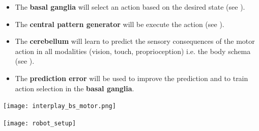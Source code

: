 \documentclass[portrait,final,a0paper,fontscale=0.33]{baposter}
\begin{document}
\begin{poster}
{\begin{adjustbox}{minipage=0.95\textwidth, margin=5pt, center}
	\begin{minipage}[l]{0.4\textwidth}
		\begin{itemize}
		\item The \textbf{basal ganglia} will select an action based on the desired state (see \cite{baladronHabitLearningHierarchical2020}).
		\item The \textbf{central pattern generator} will be execute the action (see \cite{nassourConcreteActionRepresentation2020}).
		\item The \textbf{cerebellum} will learn to predict the sensory consequences of the motor action in all modalities (vision, touch, proprioception) i.e. the body schema (see \cite{schmidForwardModelsCerebellum2019}). 
		\item The \textbf{prediction error} will be used to improve the prediction and to train action selection in the \textbf{basal ganglia}.
		\end{itemize}
	\end{minipage}
	\begin{minipage}[r]{0.35\textwidth}
		\raggedleft
		\texttt{[image: interplay\_bs\_motor.png]}
	\end{minipage}
	\begin{minipage}[r]{0.25\textwidth}
		\raggedright
		\texttt{[image: robot\_setup]}
	\end{minipage}
	\end{adjustbox}
	
	\vspace{0.3em}
}

\end{poster}
\end{document}
